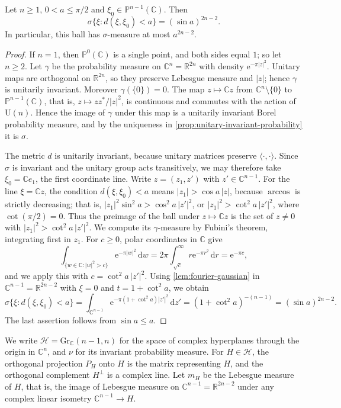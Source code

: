 \begin{lemma}\label{lem:projective-ball-volume}
Let $n\geq1$, $0<a\leq\pi/2$ and $\xi_0\in\mathbb P^{n-1}(\mathbb C)$. Then
\[
 \sigma\{\xi:d(\xi,\xi_0)<a\}=(\sin a)^{2n-2}.
\]
In particular, this ball has $\sigma$-measure at most $a^{2n-2}$.
\end{lemma}
\begin{proof}
If $n=1$, then $\mathbb P^0(\mathbb C)$ is a single point, and both sides equal $1$; so let $n\geq2$. Let $\gamma$ be the probability measure on $\mathbb C^n=\mathbb R^{2n}$ with density $\mathrm e^{-\pi|z|^2}$. Unitary maps are orthogonal on $\mathbb R^{2n}$, so they preserve Lebesgue measure and $|z|$; hence $\gamma$ is unitarily invariant. Moreover $\gamma(\{0\})=0$. The map $z\mapsto\mathbb Cz$ from $\mathbb C^n\setminus\{0\}$ to $\mathbb P^{n-1}(\mathbb C)$, that is, $z\mapsto zz^*/|z|^2$, is continuous and commutes with the action of $\mathrm U(n)$. Hence the image of $\gamma$ under this map is a unitarily invariant Borel probability measure, and by the uniqueness in \cref{prop:unitary-invariant-probability} it is $\sigma$.

The metric $d$ is unitarily invariant, because unitary matrices preserve $\langle\cdot,\cdot\rangle$. Since $\sigma$ is invariant and the unitary group acts transitively, we may therefore take $\xi_0=\mathbb Ce_1$, the first coordinate line. Write $z=(z_1,z')$ with $z'\in\mathbb C^{n-1}$. For the line $\xi=\mathbb Cz$, the condition $d(\xi,\xi_0)<a$ means $|z_1|>\cos a\,|z|$, because $\arccos$ is strictly decreasing; that is, $|z_1|^2\sin^2a>\cos^2a\,|z'|^2$, or $|z_1|^2>\cot^2a\,|z'|^2$, where $\cot(\pi/2)=0$. Thus the preimage of the ball under $z\mapsto\mathbb Cz$ is the set of $z\neq0$ with $|z_1|^2>\cot^2a\,|z'|^2$. We compute its $\gamma$-measure by Fubini's theorem, integrating first in $z_1$. For $c\geq0$, polar coordinates in $\mathbb C$ give
\[
 \int_{\{w\in\mathbb C:|w|^2>c\}}\mathrm e^{-\pi|w|^2}\,\mathrm d w=2\pi\int_{\sqrt c}^\infty r\mathrm e^{-\pi r^2}\,\mathrm d r=\mathrm e^{-\pi c},
\]
and we apply this with $c=\cot^2a\,|z'|^2$. Using \cref{lem:fourier-gaussian} in $\mathbb C^{n-1}=\mathbb R^{2n-2}$ with $\xi=0$ and $t=1+\cot^2a$, we obtain
\[
 \sigma\{\xi:d(\xi,\xi_0)<a\}=\int_{\mathbb C^{n-1}}\mathrm e^{-\pi(1+\cot^2a)|z'|^2}\,\mathrm d z'=(1+\cot^2a)^{-(n-1)}=(\sin a)^{2n-2}.
\]
The last assertion follows from $\sin a\leq a$.
\end{proof}

We write $\mathcal H=\mathrm{Gr}_{\mathbb C}(n-1,n)$ for the space of complex hyperplanes through the origin in $\mathbb C^n$, and $\nu$ for its invariant probability measure. For $H\in\mathcal H$, the orthogonal projection $P_H$ onto $H$ is the matrix representing $H$, and the orthogonal complement $H^\perp$ is a complex line. Let $m_H$ be the Lebesgue measure of $H$, that is, the image of Lebesgue measure on $\mathbb C^{n-1}=\mathbb R^{2n-2}$ under any complex linear isometry $\mathbb C^{n-1}\to H$.

